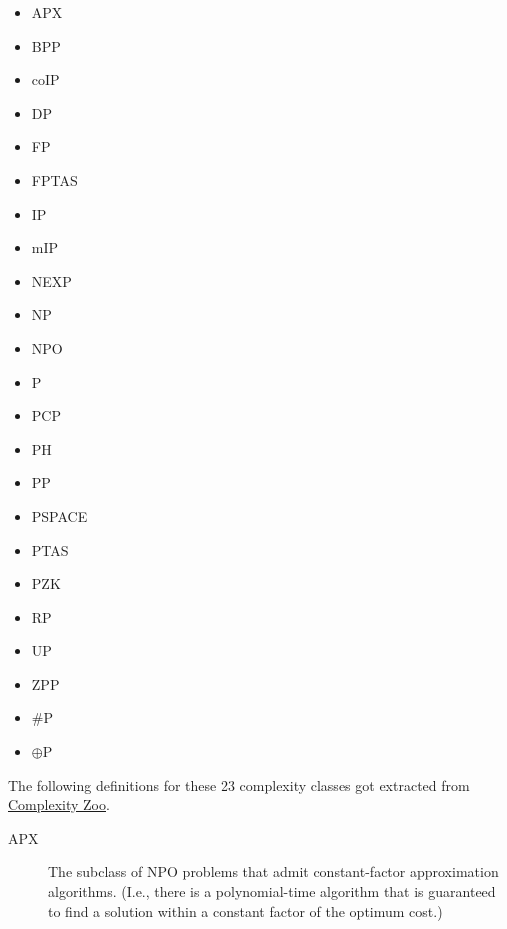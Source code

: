 \documentclass[a4paper]{article}
\newcommand{\cls}[1]{\rm{#1}}
\begin{document}
\begin{appendices}
\begin{minipage}{0.3\textwidth}
  \begin{itemize}\itemsep0pt
    \item \cls{APX}
    \item \cls{BPP}
    \item \cls{coIP}
    \item \cls{DP}
    \item \cls{FP}
    \item \cls{FPTAS}
    \item \cls{IP}
  \end{itemize}
\end{minipage}
\begin{minipage}{0.3\textwidth}
  \begin{itemize}\itemsep0pt
    \item \cls{mIP}
    \item \cls{NEXP}
    \item \cls{NP}
    \item \cls{NPO}
    \item \cls{P}
    \item \cls{PCP}
    \item \cls{PH}
    \item \cls{PP}
  \end{itemize}
\end{minipage}
\begin{minipage}{0.3\textwidth}
  \begin{itemize}\itemsep0pt
    \item \cls{PSPACE}
    \item \cls{PTAS}
    \item \cls{PZK}
    \item \cls{RP}
    \item \cls{UP}
    \item \cls{ZPP}
    \item \cls{\#P}
    \item \cls{$\oplus$P}
  \end{itemize}
\end{minipage}

The following definitions for these 23 complexity classes got extracted from \href{https://complexityzoo.uwaterloo.ca/Complexity_Zoo}{Complexity Zoo}.

\begin{description}
  \item[\cls{APX}]
    The subclass of \cls{NPO} problems that admit constant-factor approximation algorithms.  (I.e., there is a polynomial-time algorithm that is guaranteed to find a solution within a constant factor of the optimum cost.) 
    

\end{description}
\end{appendices}
\end{document}
